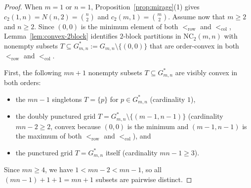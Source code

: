 \documentclass[11pt]{article}
\theoremstyle{plain}
\theoremstyle{definition}
\newcommand{\NC}{\mathrm{NC}}
\begin{document}
\begin{proof}
When $m = 1$ or $n = 1$, Proposition~\ref{prop:mirage}(1) gives $c_2(1, n) = N(n, 2) = \binom{n}{2}$ and $c_2(m, 1) = \binom{m}{2}$. Assume now that $m \ge 2$ and $n \ge 2$. Since $(0,0)$ is the minimum element of both $<_{\mathrm{row}}$ and $<_{\mathrm{col}}$, Lemma~\ref{lem:convex-2block} identifies $2$-block partitions in $\NC_2(m, n)$ with nonempty subsets $T \subseteq G_{m,n}^* := G_{m,n} \setminus \{(0,0)\}$ that are order-convex in both $<_{\mathrm{row}}$ and $<_{\mathrm{col}}$.

First, the following $mn + 1$ nonempty subsets $T \subseteq G_{m,n}^*$ are visibly convex in both orders:
\begin{itemize}\setlength{\itemsep}{2pt}
  \item[(i)] the $mn - 1$ singletons $T = \{p\}$ for $p \in G_{m,n}^*$ (cardinality $1$),
  \item[(ii)] the doubly punctured grid $T = G_{m,n}^* \setminus \{(m-1, n-1)\}$ (cardinality $mn - 2 \ge 2$, convex because $(0,0)$ is the minimum and $(m-1, n-1)$ is the maximum of both $<_{\mathrm{row}}$ and $<_{\mathrm{col}}$), and
  \item[(iii)] the punctured grid $T = G_{m,n}^*$ itself (cardinality $mn - 1 \ge 3$).
\end{itemize}
Since $mn \ge 4$, we have $1 < mn - 2 < mn - 1$, so all $(mn - 1) + 1 + 1 = mn + 1$ subsets are pairwise distinct.


\end{proof}
\end{document}
